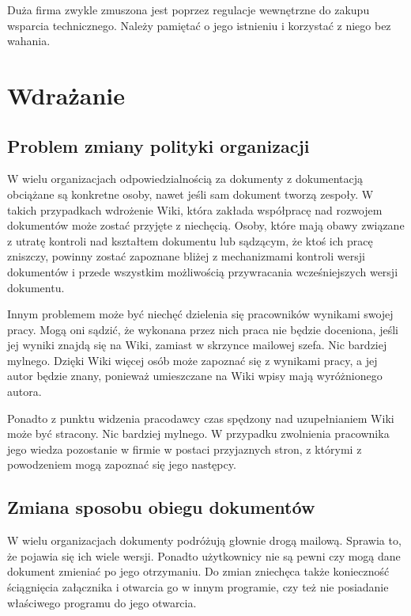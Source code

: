 \documentclass{article}
\begin{document}
	Duża firma zwykle zmuszona jest poprzez regulacje wewnętrzne do zakupu wsparcia technicznego. Należy pamiętać o jego istnieniu i korzystać z niego bez wahania.

\newpage
\section{Wdrażanie}
	\subsection{Problem zmiany polityki organizacji}


	W wielu organizacjach odpowiedzialnością za dokumenty z dokumentacją obciążane są konkretne osoby, nawet jeśli sam dokument tworzą zespoły. W takich przypadkach wdrożenie Wiki, która zakłada współpracę nad rozwojem dokumentów może zostać przyjęte z niechęcią. Osoby, które mają obawy związane z utratę kontroli nad kształtem dokumentu lub sądzącym, że ktoś ich pracę zniszczy, powinny zostać zapoznane bliżej z mechanizmami kontroli wersji dokumentów i przede wszystkim możliwością przywracania wcześniejszych wersji dokumentu. 

	Innym problemem może być niechęć dzielenia się pracowników wynikami swojej pracy. Mogą oni sądzić, że wykonana przez nich praca nie będzie doceniona, jeśli jej wyniki znajdą się na Wiki, zamiast w skrzynce mailowej szefa. Nic bardziej mylnego. Dzięki Wiki więcej osób może zapoznać się z wynikami pracy, a jej autor będzie znany, ponieważ umieszczane na Wiki wpisy mają wyróżnionego autora.

	Ponadto z punktu widzenia pracodawcy czas spędzony nad uzupełnianiem Wiki może być stracony. Nic bardziej mylnego. W przypadku zwolnienia pracownika jego wiedza pozostanie w firmie w postaci przyjaznych stron, z którymi z powodzeniem mogą zapoznać się jego następcy.

		

		


	\subsection{Zmiana sposobu obiegu dokumentów}


	W wielu organizacjach dokumenty podróżują głownie drogą mailową. Sprawia to, że pojawia się ich wiele wersji. Ponadto użytkownicy nie są pewni czy mogą dane dokument zmieniać po jego otrzymaniu. Do zmian zniechęca także konieczność ściągnięcia załącznika i  otwarcia go w innym programie, czy też nie posiadanie właściwego programu do jego otwarcia.
\end{document}
